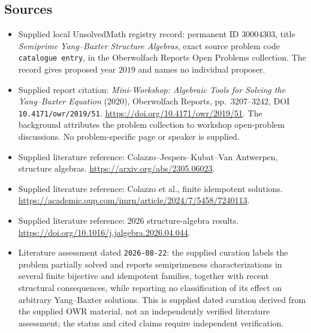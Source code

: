 \documentclass[11pt]{article}
\begin{document}
\subsection{Sources}
\begin{itemize}
\item Supplied local UnsolvedMath registry record: permanent ID \(30004303\), title \emph{Semiprime Yang--Baxter Structure Algebras}, exact source problem code \texttt{catalogue entry}, in the Oberwolfach Reports Open Problems collection. The record gives proposed year \(2019\) and names no individual proposer.
\item Supplied report citation: \emph{Mini-Workshop: Algebraic Tools for Solving the Yang--Baxter Equation} (2020), Oberwolfach Reports, pp.~3207--3242, DOI \texttt{10.4171/owr/2019/51}. \url{https://doi.org/10.4171/owr/2019/51}. The background attributes the problem collection to workshop open-problem discussions. No problem-specific page or speaker is supplied.
\item Supplied literature reference: Colazzo--Jespers--Kubat--Van Antwerpen, structure algebras. \url{https://arxiv.org/abs/2305.06023}.
\item Supplied literature reference: Colazzo et al., finite idempotent solutions. \url{https://academic.oup.com/imrn/article/2024/7/5458/7240113}.
\item Supplied literature reference: 2026 structure-algebra results. \url{https://doi.org/10.1016/j.jalgebra.2026.04.044}.
\item Literature assessment dated \texttt{2026-08-22}: the supplied curation labels the problem partially solved and reports semiprimeness characterizations in several finite bijective and idempotent families, together with recent structural consequences, while reporting no classification of its effect on arbitrary Yang--Baxter solutions. This is supplied dated curation derived from the supplied OWR material, not an independently verified literature assessment; the status and cited claims require independent verification.
\end{itemize}
\end{document}
